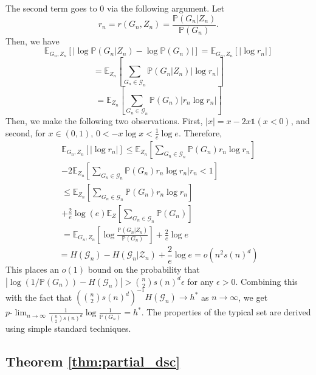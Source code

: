 \documentclass[conference,letterpaper]{IEEEtran}
\newcommand{\tti}{\rightarrow\infty}
\newcommand{\graph}{\mathcal{G}}
\newcommand{\prob}[1]{\mathbb{P}\left(#1\right)}
\newcommand{\plim}[0]{p\mbox{-}\lim}
\begin{document}
The second term goes to 0 via the following argument. Let
\begin{equation}
    r_n = r(G_n, Z_n) = \frac{\prob{G_n|Z_n}}{\prob{G_n}}.
\end{equation}
Then, we have
\begin{equation*}
    \mathbb{E}_{G_n,Z_n}[|\log \prob{G_n|Z_n} - \log \prob{G_n}|] = \mathbb{E}_{G_n,Z_n}[|\log r_n|]
\end{equation*}
\begin{equation}
    = \mathbb{E}_{Z_n}\left[\sum_{G_n \in \graph_n} \prob{G_n|Z_n} |\log r_n|\right]
\end{equation}
\begin{equation}
    = \mathbb{E}_{Z_n}\left[\sum_{G_n \in \graph_n} \prob{G_n} |r_n \log r_n| \right]
\end{equation}
Then, we make the following two observations. First, $|x| = x - 2x\mathds{1}(x < 0)$, and second, for $x \in (0,1)$, $0 < -x\log x < \frac{1}{e}\log e$. Therefore,
\begin{align}
    \mathbb{E}_{G_n,Z_n}[|\log r_n|] \leq \mathbb{E}_{Z_n}\left[\sum_{G_n \in \graph_n} \prob{G_n} r_n \log r_n \right] \nonumber \\ - 2\mathbb{E}_{Z_n}\left[\sum_{G_n \in \graph_n} \prob{G_n} r_n \log r_n \Bigg| r_n < 1 \right] \nonumber \\
    \leq \mathbb{E}_{Z_n}\left[\sum_{G_n \in \graph_n} \prob{G_n} r_n \log r_n \right] \nonumber \\+ \frac{2}{e}\log(e) \mathbb{E}_Z\left[\sum_{G_n \in \graph_n} \prob{G_n} \right] \nonumber \\
    = \mathbb{E}_{G_n,Z_n}\left[\log \frac{\prob{G_n|Z_n}}{\prob{G_n}}\right] + \frac{2}{e}\log e
\end{align}
\begin{equation}
    = H(\graph_n) - H(\graph_n|\mathcal{Z}_n) + \frac{2}{e}\log e = o(n^2s(n)^d)
\end{equation}
This places an $o(1)$ bound on the probability that $|\log(1/\prob{G_n}) - H(\graph_n)| > \binom{n}{2}s(n)^d\epsilon$ for any $\epsilon>0$. Combining this with the fact that $(\binom{n}{2}s(n)^d)^{-1}H(\graph_n) \to h^*$ as $n\tti$, we get $\plim_{n\tti} \frac{1}{\binom{n}{2}s(n)^d}\log \frac{1}{\prob{G_n}} = h^*$. The properties of the typical set are derived using simple standard techniques.

\subsection{Theorem \ref{thm:partial_dsc}}
\end{document}
